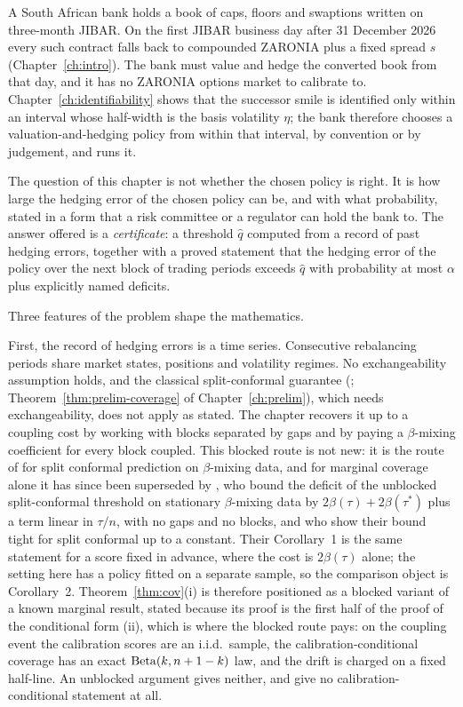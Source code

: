 \documentclass[../../../main.tex]{subfiles}
\begin{document}
A South African bank holds a book of caps, floors and swaptions written on three-month JIBAR. On the first JIBAR business day after 31 December 2026 every such contract falls back to compounded ZARONIA plus a fixed spread $s$ (Chapter~\ref{ch:intro}). The bank must value and hedge the converted book from that day, and it has no ZARONIA options market to calibrate to. Chapter~\ref{ch:identifiability} shows that the successor smile is identified only within an interval whose half-width is the basis volatility $\eta$; the bank therefore chooses a valuation-and-hedging policy from within that interval, by convention or by judgement, and runs it.

The question of this chapter is not whether the chosen policy is right. It is how large the hedging error of the chosen policy can be, and with what probability, stated in a form that a risk committee or a regulator can hold the bank to. The answer offered is a \emph{certificate}: a threshold $\hat q$ computed from a record of past hedging errors, together with a proved statement that the hedging error of the policy over the next block of trading periods exceeds $\hat q$ with probability at most $\alpha$ plus explicitly named deficits.

Three features of the problem shape the mathematics.

First, the record of hedging errors is a time series. Consecutive rebalancing periods share market states, positions and volatility regimes. No exchangeability assumption holds, and the classical split-conformal guarantee (\cite{vovk2005}; Theorem~\ref{thm:prelim-coverage} of Chapter~\ref{ch:prelim}), which needs exchangeability, does not apply as stated. The chapter recovers it up to a coupling cost by working with blocks separated by gaps and by paying a $\beta$-mixing coefficient for every block coupled. This blocked route is not new: it is the route of \cite{oliveira2024} for split conformal prediction on $\beta$-mixing data, and for marginal coverage alone it has since been superseded by \citep[Cor.~2]{barber2026}, who bound the deficit of the unblocked split-conformal threshold on stationary $\beta$-mixing data by $2\beta(\tau)+2\beta(\tau^*)$ plus a term linear in $\tau/n$, with no gaps and no blocks, and who show their bound tight for split conformal up to a constant. Their Corollary~1 is the same statement for a score fixed in advance, where the cost is $2\beta(\tau)$ alone; the setting here has a policy fitted on a separate sample, so the comparison object is Corollary~2. Theorem~\ref{thm:cov}(i) is therefore positioned as a blocked variant of a known marginal result, stated because its proof is the first half of the proof of the conditional form (ii), which is where the blocked route pays: on the coupling event the calibration scores are an i.i.d.\ sample, the calibration-conditional coverage has an exact $\operatorname{Beta}(k,n+1-k)$ law, and the drift is charged on a fixed half-line. An unblocked argument gives neither, and \cite{barber2026} give no calibration-conditional statement at all.
\end{document}
